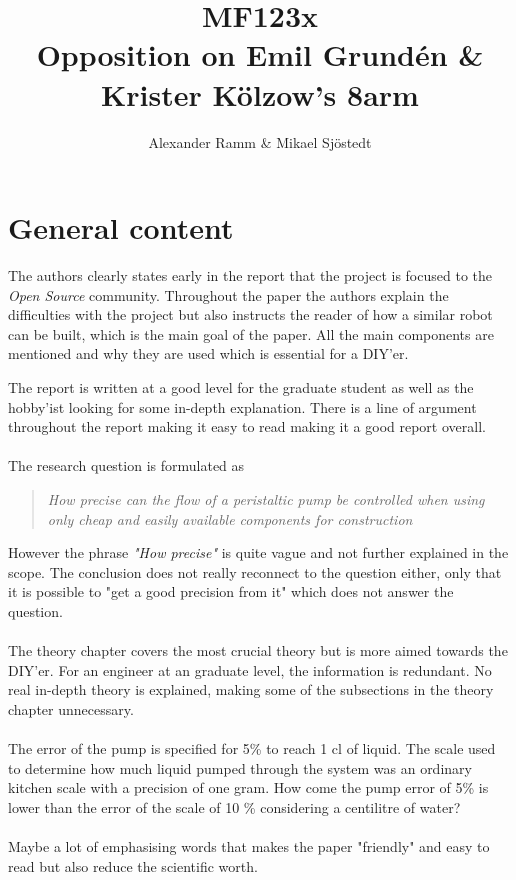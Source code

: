 \documentclass{article}
\begin{document}
\title{MF123x\\ Opposition on Emil Grundén \& Krister Kölzow's 8arm \\}
\author{Alexander Ramm \& Mikael Sjöstedt}
\maketitle
\clearpage

\section{General content}
The authors clearly states early in the report that the  project is focused to the \textit{Open Source} community. Throughout the paper the authors explain the difficulties with the project but also instructs the reader of how a similar robot can be built, which is the main goal of the paper. All the main components are mentioned and why they are used which is essential for a DIY'er.

The report is written at a good level for the graduate student as well as the hobby'ist looking for some in-depth explanation. There is a line of argument throughout the report making it easy to read making it a good report overall. 
\\ \\
The research question is formulated as
\begin{quote}
\textit{How precise can the flow of a peristaltic pump be controlled when using only cheap and easily available components for construction}
\end{quote}
However the phrase \textit{"How precise"} is quite vague and not further explained in the scope. The conclusion does not really reconnect to the question either, only that it is possible to "get a good precision from it" which does not answer the question.  
\\ \\
The theory chapter covers the most crucial theory but is more aimed towards the DIY'er. For an engineer at an graduate level, the information is redundant. No real in-depth theory is explained, making some of the subsections in the theory chapter unnecessary.
\\ \\
The error of the pump is specified for 5\% to reach 1 cl of liquid. The scale used to determine how much liquid pumped through the system was an ordinary kitchen scale with a precision of one gram. How come the pump error of 5\% is lower than the error of the scale of 10 \% considering a centilitre of water? 
\\ \\
Maybe a lot of emphasising words that makes the paper "friendly" and easy to read but also reduce the scientific worth.
\end{document}
